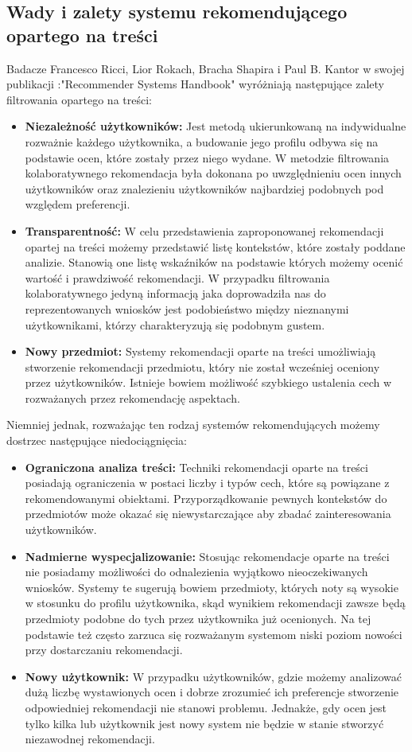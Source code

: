 \documentclass[12pt,a4paper]{report}
\begin{document}
{\subsection{Wady i zalety systemu rekomendującego opartego na treści}
Badacze Francesco Ricci, Lior Rokach, Bracha Shapira i Paul B. Kantor w swojej publikacji :"Recommender Systems
Handbook" wyróżniają następujące zalety filtrowania opartego na treści: 
\begin{itemize}
\item \textbf{Niezależność użytkowników:} Jest metodą ukierunkowaną na indywidualne rozważnie każdego użytkownika, a budowanie jego profilu odbywa się na podstawie ocen, które zostały przez niego wydane. W metodzie filtrowania kolaboratywnego rekomendacja była dokonana po uwzględnieniu ocen innych użytkowników oraz znalezieniu użytkowników najbardziej podobnych pod względem preferencji.
\item \textbf{Transparentność:} W celu przedstawienia zaproponowanej rekomendacji opartej na treści możemy przedstawić listę kontekstów, które zostały poddane analizie. Stanowią one listę wskaźników na podstawie których możemy ocenić wartość i prawdziwość rekomendacji. W przypadku filtrowania kolaboratywnego jedyną informacją jaka doprowadziła nas do reprezentowanych wniosków jest podobieństwo między nieznanymi użytkownikami, którzy charakteryzują się podobnym gustem.
\item \textbf{Nowy przedmiot:} Systemy rekomendacji oparte na treści umożliwiają stworzenie rekomendacji przedmiotu, który nie został wcześniej oceniony przez użytkowników. Istnieje bowiem możliwość szybkiego ustalenia cech w rozważanych przez rekomendację aspektach. 
\end{itemize}
Niemniej jednak, rozważając ten rodzaj systemów rekomendujących możemy dostrzec następujące niedociągnięcia:
\begin{itemize}
\item \textbf{Ograniczona analiza treści:} Techniki rekomendacji oparte na treści posiadają ograniczenia w postaci liczby i typów cech, które są powiązane z rekomendowanymi obiektami. Przyporządkowanie pewnych kontekstów do przedmiotów może okazać się niewystarczające aby zbadać zainteresowania użytkowników.
\item \textbf{Nadmierne wyspecjalizowanie:} Stosując rekomendacje oparte na treści nie posiadamy możliwości do odnalezienia wyjątkowo nieoczekiwanych wniosków. Systemy te sugerują bowiem przedmioty, których noty są wysokie w stosunku do profilu użytkownika, skąd wynikiem rekomendacji zawsze będą przedmioty podobne do tych przez użytkownika już ocenionych. Na tej podstawie też często zarzuca się rozważanym systemom niski poziom nowości przy dostarczaniu rekomendacji.
 \item \textbf{Nowy użytkownik:} W przypadku użytkowników, gdzie możemy analizować dużą liczbę wystawionych ocen i dobrze zrozumieć ich preferencje stworzenie odpowiedniej rekomendacji nie stanowi problemu. Jednakże, gdy ocen jest tylko kilka lub użytkownik jest nowy system nie będzie w stanie stworzyć niezawodnej rekomendacji.
\end{itemize} 

}
\end{document}

